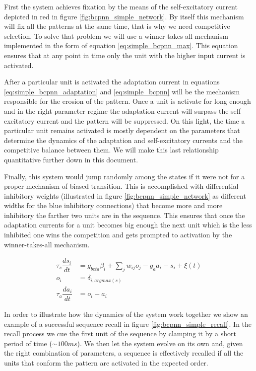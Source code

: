 \documentclass[10pt,a4paper]{article}
\begin{document}
First the system achieves fixation by the means of the self-excitatory current depicted in red in figure \ref{fig:bcpnn_simple_network}. By itself this mechanism will fix all the patterns at the same time, that is why we need competitive selection.  To solve that problem we will use a winner-takes-all mechanism \cite{yuille1998winner} implemented in the form of equation \ref{eq:simple_bcpnn_max}. This equation ensures that at any point in time only the unit with the higher input current is activated. 


After a particular unit is activated the adaptation current in equations \ref{eq:simple_bcpnn_adaptation} and \ref{eq:simple_bcpnn}  will be the mechanism responsible for the erosion of the pattern. Once a unit is activate for long enough and in the right parameter regime the adaptation current will surpass the self-excitatory current and the pattern will be suppressed. On this light, the time a particular unit remains activated is mostly dependent on the parameters that determine the dynamics of the adaptation and self-excitatory currents and the competitive balance between them. We will make this last relationship quantitative further down in this document. 

Finally, this system would jump randomly among the states if it were not for a proper mechanism of biased transition. This is accomplished with differential inhibitory weights (illustrated in figure \ref{fig:bcpnn_simple_network} as different widths for the blue inhibitory connections) that become more and more inhibitory the farther two units are in the sequence. This ensures that once the adaptation currents for a unit becomes big enough the next unit which is the less inhibited one wins the competition and gets prompted to activation by the winner-takes-all mechanism.  

\begin{align}
\tau_s \dfrac{ds_i}{dt} &= g_{beta}\beta_i + \sum_{j} w_{ij} o_j  - g_a a_i - s_i  + \xi(t) \label{eq:simple_bcpnn} \\ 
o_i &=  \delta_{i, argmax(s)} \label{eq:simple_bcpnn_max} \\ 
\tau_a \dfrac{da_i}{dt} &= o_i - a_i \label{eq:simple_bcpnn_adaptation}
\end{align}

In order to illustrate how the dynamics of the system work together we show an example of a successful sequence recall in figure \ref{fig:bcpnn_simple_recall}. In the recall process we cue the first unit of the sequence by clamping it by a short period of time ($\sim 100ms$). We then let the system evolve on its own and, given the right combination of parameters, a sequence is effectively recalled if all the units that conform the pattern are activated in the expected order. 
\end{document}
